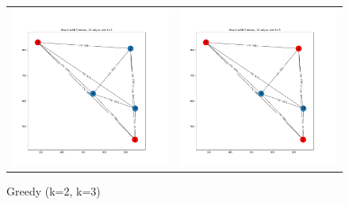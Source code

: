 \documentclass[longpaper, english, final, times]{revdetua}
\begin{document}
		\begin{figure}[!h]
			\begin{tabular}{cc}
				\includegraphics[width=0.5\linewidth]{imgs/greedy_n5_k2.png} &   \includegraphics[width=0.5\linewidth]{imgs/greedy_n5_k3.png} \\
			\end{tabular}
			\caption{Greedy (k=2, k=3)}
			\label{figure:greedyk2_k3}
		\end{figure}
	
\end{document}

